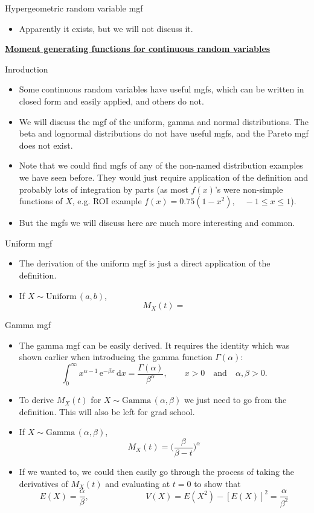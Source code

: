 \documentclass{article}
\newcommand{\bu}[1]{\textbf{\ul{#1}}}				%
\newcommand{\follow}[1]{\sim \text{#1}\,}		%
\newcommand{\integral}[4]{\displaystyle \int_{#1}^{#2} #3 \,\mathrm{d} #4}		%
\newcommand{\e}{\mathrm{e}}		%
\newcommand{\gam}[1]{\Gamma(#1)}		%
\begin{document}
Hypergeometric random variable mgf\bigskip
\begin{itemize}
    \item Apparently it exists, but we will not discuss it.
\end{itemize}\bigskip

\bu{Moment generating functions for continuous random variables}\bigskip

Inroduction\bigskip
\begin{itemize}
    \item Some continuous random variables have useful mgfs, which can be written in closed form and easily applied, and others do not.
    \item[] We will discuss the mgf of the uniform, gamma and normal distributions. The beta and lognormal distributions do not have useful mgfs, and the Pareto mgf does not exist.
    \item Note that we could find mgfs of any of the non-named distribution examples we have seen before. They would just require application of the definition and probably lots of integration by parts (as most $f(x)$'s were non-simple functions of $X$, e.g. ROI example $f(x) = 0.75(1 - x^2), \quad -1 \le x \le 1$).
    \item[] But the mgfs we will discuss here are much more interesting and common.
\end{itemize}\bigskip

Uniform mgf\bigskip
\begin{itemize}
    \item The derivation of the uniform mgf is just a direct application of the definition.\vspace{150pt}
    \item If $X \follow{Uniform}(a, b)$,
    \[M_X(t) = \]
\end{itemize}\newpage

Gamma mgf\bigskip
\begin{itemize}
    \item The gamma mgf can be easily derived. It requires the identity which was shown earlier when introducing the gamma function $\gam{\alpha}$:
    \[\integral{0}{\infty}{x^{\alpha - 1} \, \e^{-\beta x}}{x} = \frac{\gam{\alpha}}{\beta^\alpha}, \quad\quad x > 0 \quad \text{and} \quad \alpha, \beta > 0.\]
    \item To derive $M_X(t)$ for $X \follow{Gamma}(\alpha, \beta)$ we just need to go from the definition. This will also be left for grad school.
    \item If $X \follow{Gamma}(\alpha, \beta)$,
    \[M_X(t) = \bigg(\frac{\beta}{\beta - t}\bigg)^\alpha\]
    \item If we wanted to, we could then easily go through the process of taking the derivatives of $M_X(t)$ and evaluating at $t = 0$ to show that
    \[E(X) = \frac{\alpha}{\beta}, \hspace{80pt} V(X) = E(X^2) - [E(X)]^2 = \frac{\alpha}{\beta^2}\]
\end{itemize}\bigskip
\end{document}
